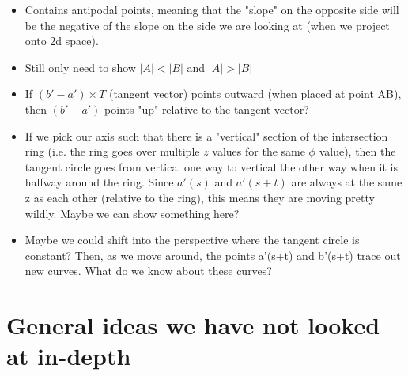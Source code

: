 \documentclass[12pt]{article}
\begin{document}
\begin{itemize}
\item Contains antipodal points, meaning that the "slope" on the opposite side will be the negative of the slope on the side we are looking at (when we project onto 2d space).
\item Still only need to show $|A| < |B|$ and $|A| > |B|$
\item If $(b' - a') \times T$ (tangent vector) points outward (when placed at point AB), then $(b' - a')$ points "up" relative to the tangent vector?
\item If we pick our axis such that there is a "vertical" section of the intersection ring (i.e. the ring goes over multiple $z$ values for the same $\phi$ value), then the tangent circle goes from vertical one way to vertical the other way when it is halfway around the ring. Since $a'(s)$ and $a'(s+t)$ are always at the same z as each other (relative to the ring), this means they are moving pretty wildly. Maybe we can show something here?
\item Maybe we could shift into the perspective where the tangent circle is constant? Then, as we move around, the points a'(s+t) and b'(s+t) trace out new curves. What do we know about these curves?
\end{itemize}

\section{General ideas we have not looked at in-depth}
\end{document}
